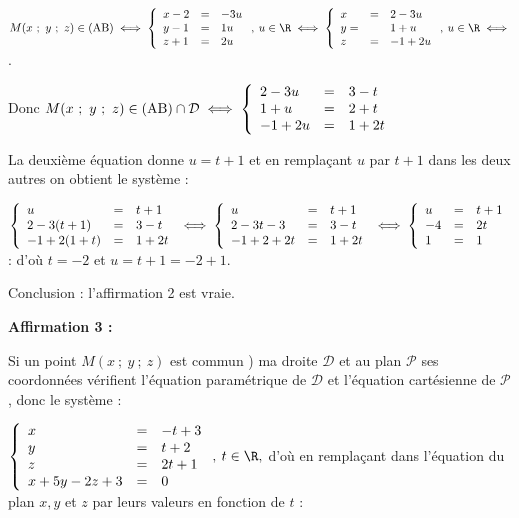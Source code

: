 $M(x~;~y~;~z) \in (\text{AB}) \iff \left\{\begin{array}{l c l}
x - 2 &=& -3u\\
y - 1&=&1u\\
z + 1 &=&2u
\end{array}\right., \: u \in \R \iff \left\{\begin{array}{l c l}
x &=& 2  -3u\\
y =& &1 + u\\
z &=&- 1 + 2u
\end{array}\right., \: u \in \R \iff$.

Donc $M(x~;~y~;~z) \in (\text{AB}) \cap \mathcal{D} \iff \left\{\begin{array}{l c l}
2 - 3u	&=&3 - t\\
1 + u	&=&2 + t\\
- 1 + 2u&=&1 + 2t
\end{array}\right.$

La deuxième équation donne $u = t + 1$ et  en remplaçant $u$ par $t + 1$ dans les deux autres on obtient le système :

$\left\{\begin{array}{l c l}
u 				&=& t + 1\\
2 - 3(t + 1) 	&=& 3 - t\\
- 1 + 2(1 + t) 	&=&1 + 2t
\end{array}\right. \iff \left\{\begin{array}{l c l}
u 				&=& t + 1\\
2 - 3t - 3 		&=& 3 - t\\
- 1 + 2 + 2t 	&=&1 + 2t
\end{array}\right.\iff
\left\{\begin{array}{l c l}
u 	&=& t + 1\\
- 4	&=& 2t\\
1 	&=& 1
\end{array}\right.$ : d'où $t = - 2$ et $u = t + 1 = - 2 + 1$.

Conclusion : l'affirmation 2 est vraie.

\medskip

\textbf{Affirmation 3 :}


Si un point $M(x~;~y~;~z)$ est commun ) ma droite $\mathcal{D}$ et au plan $\mathcal{P}$ ses coordonnées vérifient l'équation paramétrique de $\mathcal{D}$ et l'équation cartésienne de $\mathcal{P}$, donc le système :

$\left\{\begin{array}{l c l}
x&=&-t +3\\
y&=&t+ 2\\
z &=& 2t +1\\
x + 5y - 2z + 3&=&0
\end{array}\right., \: t \in \R,$ d'où en remplaçant dans l'équation du plan $x, y$ et $z$ par leurs valeurs en fonction de $t$ :


